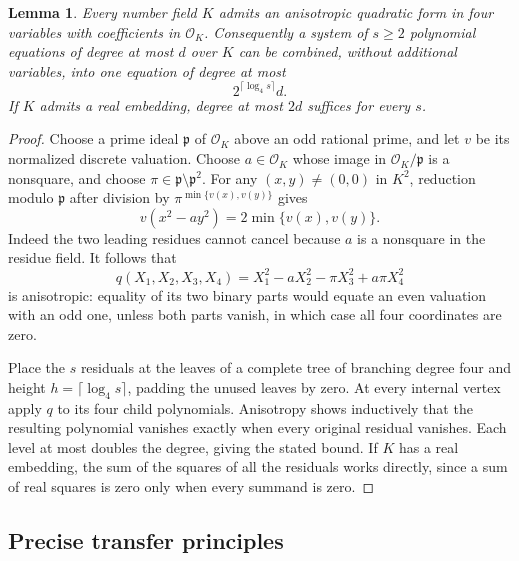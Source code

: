 \documentclass[11pt]{article}
\newtheorem{lemma}[theorem]{Lemma}
\theoremstyle{definition}
\begin{document}
\begin{lemma}\label{lem:four-variable-anisotropic}
Every number field $K$ admits an anisotropic quadratic form in four
variables with coefficients in $\mathcal O_K$.  Consequently a system
of $s\geq2$ polynomial equations of degree at most $d$ over $K$ can be
combined, without additional variables, into one equation of degree at
most
\[
 2^{\lceil\log_4 s\rceil}d.
\]
If $K$ admits a real embedding, degree at most $2d$ suffices for every
$s$.
\end{lemma}
\begin{proof}
Choose a prime ideal $\mathfrak p$ of $\mathcal O_K$ above an odd
rational prime, and let $v$ be its normalized discrete valuation.
Choose $a\in\mathcal O_K$ whose image in
$\mathcal O_K/\mathfrak p$ is a nonsquare, and choose
$\pi\in\mathfrak p\setminus\mathfrak p^2$.  For any
$(x,y)\ne(0,0)$ in $K^2$, reduction modulo $\mathfrak p$ after
division by $\pi^{\min\{v(x),v(y)\}}$ gives
\[
 v(x^2-ay^2)=2\min\{v(x),v(y)\}.
\]
Indeed the two leading residues cannot cancel because $a$ is a
nonsquare in the residue field.  It follows that
\[
 q(X_1,X_2,X_3,X_4)
 =X_1^2-aX_2^2-\pi X_3^2+a\pi X_4^2
\]
is anisotropic: equality of its two binary parts would equate an even
valuation with an odd one, unless both parts vanish, in which case all
four coordinates are zero.

Place the $s$ residuals at the leaves of a complete tree of branching
degree four and height $h=\lceil\log_4 s\rceil$, padding the unused
leaves by zero.  At every internal vertex apply $q$ to its four child
polynomials.  Anisotropy shows inductively that the resulting polynomial
vanishes exactly when every original residual vanishes.  Each level
at most doubles the degree, giving the stated bound.  If $K$ has a
real embedding, the sum of the squares of all the residuals works
directly, since a sum of real squares is zero only when every summand
is zero.
\end{proof}

\subsection{Precise transfer principles}
\end{document}
